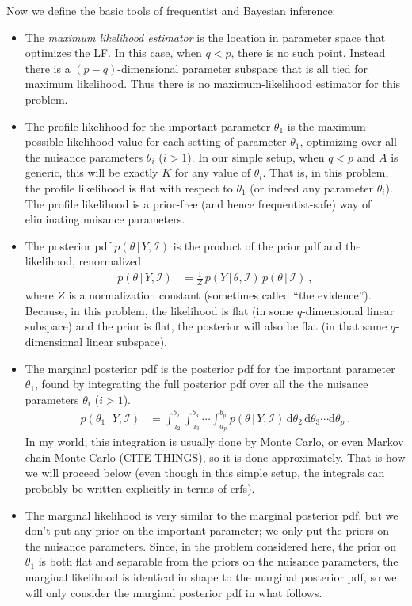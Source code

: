 \documentclass[10pt]{article}
\newcommand{\given}{\,|\,}
\newcommand{\dd}{\mathrm{d}}
\begin{document}
Now we define the basic tools of frequentist and Bayesian inference:
\begin{itemize}
\item
The \emph{maximum likelihood estimator} is the location in parameter space that optimizes the LF.
In this case, when $q<p$, there is no such point.
Instead there is a $(p-q)$-dimensional parameter subspace that is all tied for maximum likelihood.
Thus there is no maximum-likelihood estimator for this problem.
\item
The profile likelihood for the important parameter $\theta_1$ is the maximum possible likelihood value for each setting of parameter $\theta_1$, optimizing over all the nuisance parameters $\theta_i$ ($i>1$).
In our simple setup, when $q<p$ and $A$ is generic, this will be exactly $K$ for any value of $\theta_i$.
That is, in this problem, the profile likelihood is flat with respect to $\theta_1$ (or indeed any parameter $\theta_i$).
The profile likelihood is a prior-free (and hence frequentist-safe) way of eliminating nuisance parameters.
\item
The posterior pdf $p(\theta\given Y,\mathscr{I})$ is the product of the prior pdf and the likelihood, renormalized
\begin{align}
    p(\theta\given Y,\mathscr{I}) &= \frac{1}{Z}\,p(Y\given\theta,\mathscr{I})\,p(\theta\given\mathscr{I}) ~,
\end{align}
where $Z$ is a normalization constant (sometimes called ``the evidence'').
Because, in this problem, the likelihood is flat (in some $q$-dimensional linear subspace) and the prior is flat, the posterior will also be flat (in that same $q$-dimensional linear subspace).
\item
The marginal posterior pdf is the posterior pdf for the important parameter $\theta_1$, found by integrating the full posterior pdf over all the the nuisance parameters $\theta_i$ ($i>1$).
\begin{align}
    p(\theta_1\given Y,\mathscr{I}) &= \int_{a_2}^{b_2}\int_{a_3}^{b_3}\cdots\int_{a_p}^{b_p} p(\theta\given Y,\mathscr{I})\,\dd\theta_2\,\dd\theta_3\cdots\dd\theta_p ~.
\end{align}
In my world, this integration is usually done by Monte Carlo, or even Markov chain Monte Carlo (CITE THINGS), so it is done approximately.
That is how we will proceed below (even though in this simple setup, the integrals can probably be written explicitly in terms of erfs).
\item
The marginal likelihood is very similar to the marginal posterior pdf, but we don't put any prior on the important parameter; we only put the priors on the nuisance parameters.
Since, in the problem considered here, the prior on $\theta_1$ is both flat and separable from the priors on the nuisance parameters, the marginal likelihood is identical in shape to the marginal posterior pdf, so we will only consider the marginal posterior pdf in what follows.
\end{itemize}
\end{document}
